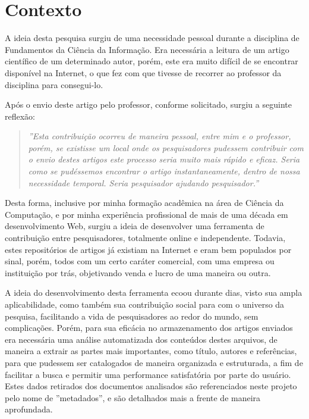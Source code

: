 \section{Contexto}
\label{sec:context}

A ideia desta pesquisa surgiu de uma necessidade pessoal durante a disciplina de Fundamentos da Ciência da Informação. Era necessária a leitura de um artigo científico de um determinado autor, porém, este era muito difícil de se encontrar disponível na Internet, o que fez com que tivesse de recorrer ao professor da disciplina para consegui-lo.

Após o envio deste artigo pelo professor, conforme solicitado, surgiu a seguinte reflexão:

\begin{quote}
	\textit{''Esta contribuição ocorreu de maneira pessoal, entre mim e o professor, porém, se existisse um local onde os pesquisadores pudessem contribuir com o envio destes artigos este processo seria muito mais rápido e eficaz. Seria como se pudéssemos encontrar o artigo instantaneamente, dentro de nossa necessidade temporal. Seria pesquisador ajudando pesquisador.''}
\end{quote}

Desta forma, inclusive por minha formação acadêmica na área de Ciência da Computação, e por minha experiência profissional de mais de uma década em desenvolvimento Web, surgiu a ideia de desenvolver uma ferramenta de contribuição entre pesquisadores, totalmente online e independente. Todavia, estes repositórios de artigos já existiam na Internet e eram bem populados por sinal, porém, todos com um certo caráter comercial, com uma empresa ou instituição por trás, objetivando venda e lucro de uma maneira ou outra.

A ideia do desenvolvimento desta ferramenta ecoou durante dias, visto sua ampla aplicabilidade, como também sua contribuição social para com o universo da pesquisa, facilitando a vida de pesquisadores ao redor do mundo, sem complicações. Porém, para sua eficácia no armazenamento dos artigos enviados era necessária uma análise automatizada dos conteúdos destes arquivos, de maneira a extrair as partes mais importantes, como título, autores e referências, para que pudessem ser catalogados de maneira organizada e estruturada, a fim de facilitar a busca e permitir uma performance satisfatória por parte do usuário. Estes dados retirados dos documentos analisados são referenciados neste projeto pelo nome de ''metadados'', e são detalhados mais a frente de maneira aprofundada.


